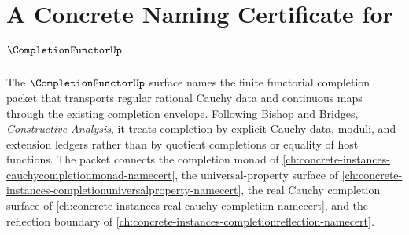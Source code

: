 \chapter{A Concrete Naming Certificate for $\CompletionFunctorUp$}
\label{ch:concrete-instances-completionfunctor-namecert}

The $\CompletionFunctorUp$ surface names the finite functorial completion packet that transports regular rational Cauchy data and continuous maps through the existing completion envelope. Following Bishop and Bridges, \emph{Constructive Analysis}, it treats completion by explicit Cauchy data, moduli, and extension ledgers rather than by quotient completions or equality of host functions. The packet connects the completion monad of \autoref{ch:concrete-instances-cauchycompletionmonad-namecert}, the universal-property surface of \autoref{ch:concrete-instances-completionuniversalproperty-namecert}, the real Cauchy completion surface of \autoref{ch:concrete-instances-real-cauchy-completion-namecert}, and the reflection boundary of \autoref{ch:concrete-instances-completionreflection-namecert}.

